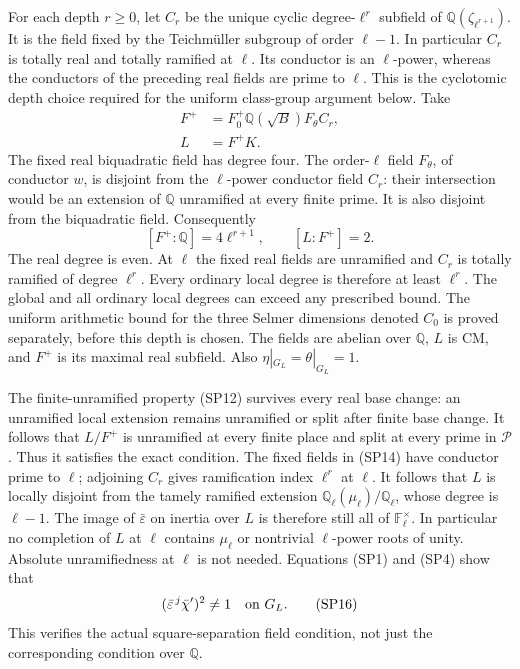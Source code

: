For each depth \(r\ge0\), let \(C_r\) be the unique
cyclic degree-\(\ell^r\) subfield of
\(\mathbb Q(\zeta_{\ell^{r+1}})\).
It is the field fixed by the Teichm\"uller subgroup of
order \(\ell-1\).
In particular \(C_r\) is totally real and totally ramified
at \(\ell\).
Its conductor is an \(\ell\)-power, whereas the conductors
of the preceding real fields are prime to \(\ell\).
This is the cyclotomic depth choice required for the
uniform class-group argument below.
Take
\[
 \begin{split}
 F^+&=F_0^+\mathbb Q(\sqrt B)F_\theta C_r,\\
                         L&=F^+K .
 \end{split}
 \tag{SP14}
\]
The fixed real biquadratic field has degree four.
The order-\(\ell\) field \(F_\theta\), of conductor \(w\),
is disjoint from the \(\ell\)-power conductor field \(C_r\):
their intersection would be an extension of \(\mathbb Q\)
unramified at every finite prime.
It is also disjoint from the biquadratic field.
Consequently
\[
                 [F^+:\mathbb Q]=4\ell^{r+1},
                        \qquad [L:F^+]=2 .
 \tag{SP15}
\]
The real degree is even.
At \(\ell\) the fixed real fields are unramified and
\(C_r\) is totally ramified of degree \(\ell^r\).
Every ordinary local degree is therefore at least
\(\ell^r\).
The global and all ordinary local degrees can exceed
any prescribed bound.
The uniform arithmetic bound for the three Selmer
dimensions denoted \(C_0\) is proved separately, before
this depth is chosen.
The fields are abelian over \(\mathbb Q\), \(L\) is CM,
and \(F^+\) is its maximal real subfield.
Also \(\eta|_{G_L}=\theta|_{G_L}=1\).

The finite-unramified property (SP12) survives every real
base change: an unramified local extension remains
unramified or split after finite base change.
It follows that \(L/F^+\) is unramified at every finite
place and split at every prime in \(\mathcal P\).
Thus it satisfies the exact  condition.
The fixed fields in (SP14) have conductor prime to
\(\ell\); adjoining \(C_r\) gives ramification index
\(\ell^r\) at \(\ell\).
It follows that \(L\) is locally disjoint from the
tamely ramified extension
\(\mathbb Q_\ell(\mu_\ell)/\mathbb Q_\ell\),
whose degree is \(\ell-1\).
The image of \(\bar\varepsilon\) on inertia over \(L\)
is therefore still all of \(\mathbb F_\ell^\times\).
In particular no completion of \(L\) at \(\ell\)
contains \(\mu_\ell\) or nontrivial \(\ell\)-power roots
of unity.
Absolute unramifiedness at \(\ell\) is not needed.
Equations (SP1) and (SP4) show that
\[
               (\bar\varepsilon^{\,j}\bar\chi')^2
                                      \ne1\quad\hbox{on }G_L .
 \tag{SP16}
\]
This verifies the actual square-separation field condition,
not just the corresponding condition over \(\mathbb Q\).

